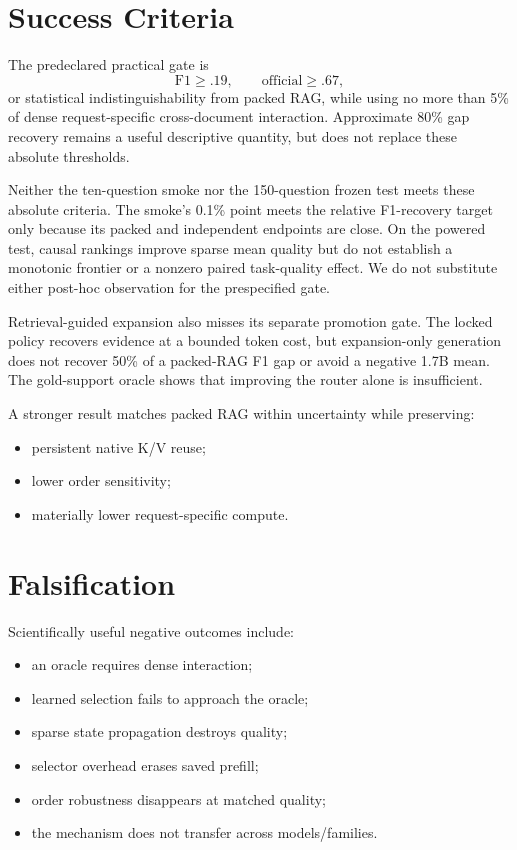 \documentclass[11pt]{article}
\begin{document}
\section{Success Criteria}

The predeclared practical gate is
\[
\mathrm{F1}\ge .19,
\qquad
\mathrm{official}\ge .67,
\]
or statistical indistinguishability from packed RAG, while using no more than
5\% of dense request-specific cross-document interaction. Approximate 80\%
gap recovery remains a useful descriptive quantity, but does not replace these
absolute thresholds.

Neither the ten-question smoke nor the 150-question frozen test meets these
absolute criteria. The smoke's 0.1\% point meets the relative F1-recovery target
only because its packed and independent endpoints are close. On the powered
test, causal rankings improve sparse mean quality but do not establish a
monotonic frontier or a nonzero paired task-quality effect. We do not substitute
either post-hoc observation for the prespecified gate.

Retrieval-guided expansion also misses its separate promotion gate. The locked
policy recovers evidence at a bounded token cost, but expansion-only generation
does not recover 50\% of a packed-RAG F1 gap or avoid a negative 1.7B mean.
The gold-support oracle shows that improving the router alone is insufficient.

A stronger result matches packed RAG within uncertainty while preserving:
\begin{itemize}[leftmargin=*]
    \item persistent native K/V reuse;
    \item lower order sensitivity;
    \item materially lower request-specific compute.
\end{itemize}

\section{Falsification}

Scientifically useful negative outcomes include:
\begin{itemize}[leftmargin=*]
    \item an oracle requires dense interaction;
    \item learned selection fails to approach the oracle;
    \item sparse state propagation destroys quality;
    \item selector overhead erases saved prefill;
    \item order robustness disappears at matched quality;
    \item the mechanism does not transfer across models/families.
\end{itemize}
\end{document}
